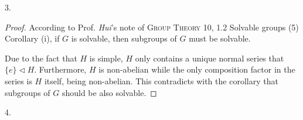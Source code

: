 \begin{exercise}
    3.
\end{exercise}

\begin{proof}
    According to Prof. \textit{Hui}'s note of \textsc{Group Theory 10}, 1.2 Solvable groups (5) Corollary (i), if $G$ is solvable, then subgroups of $G$ must be solvable.

    Due to the fact that $H$ is simple, $H$ only contains a unique normal series that $\{e\}\triangleleft H$. Furthermore, $H$ is non-abelian while the only composition factor in the series is $H$ itself, being non-abelian. This contradicts with the corollary that subgroups of $G$ should be also solvable.
\end{proof}

\begin{exercise}
    4.
\end{exercise}

